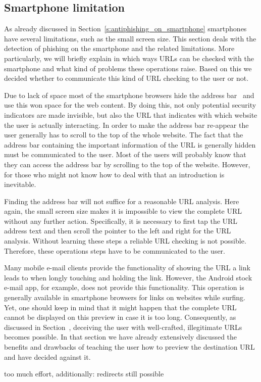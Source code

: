 \subsection{Smartphone limitation}
As already discussed in Section~\ref{s:antiphishing_on_smartphone} smartphones have several limitations, such as the small screen size. 
This section deals with the detection of phishing on the smartphone and the related limitations.
More particularly, we will briefly explain in which ways URLs can be checked with the smartphone and what kind of problems these operations raise.
Based on this we decided whether to communicate this kind of URL checking to the user or not.

\begin{description}[leftmargin=0cm]
	\item[Invisible Address Bar] Due to lack of space most of the smartphone browsers hide the address bar~\cite{amrutkar2012measuring} and use this won space for the web content. 
By doing this, not only potential security indicators are made invisible, but also the URL that indicates with which website the user is actually interacting.
In order to make the address bar re-appear the user generally has to scroll to the top of the whole website.
The fact that the address bar containing the important information of the URL is generally hidden must be communicated to the user.
Most of the users will probably know that they can access the address bar by scrolling to the top of the website.
However, for those who might not know how to deal with that an introduction is inevitable.

	\item[Analyze Complete URL Via Address Bar] Finding the address bar will not suffice for a reasonable URL analysis. 
Here again, the small screen size makes it is impossible to view the complete URL without any further action.
Specifically, it is necessary to first tap the URL address text and then scroll the pointer to the left and right for the URL analysis.
Without learning these steps a reliable URL checking is not possible. 
Therefore, these operations steps have to be communicated to the user.

	\item[Show URL Before Click] Many mobile e-mail clients provide the functionality of showing the URL a link leads to when longly touching and holding the link.
However, the Android stock e-mail app, for example, does not provide this functionality.
This operation is generally available in smartphone browsers for links on websites while surfing.
Yet, one should keep in mind that it might happen that the complete URL cannot be displayed on this preview in case it is too long. 
Consequently, as discussed in Section~\cite{s:coverage}, deceiving the user with well-crafted, illegitimate URLs becomes possible. 
In that section we have already extensively discussed the benefits and drawbacks of teaching the user how to preview the destination URL and have decided against it.

	\item[Copy and Paste URL] too much effort, additionally: redirects still possible
\end{description}


